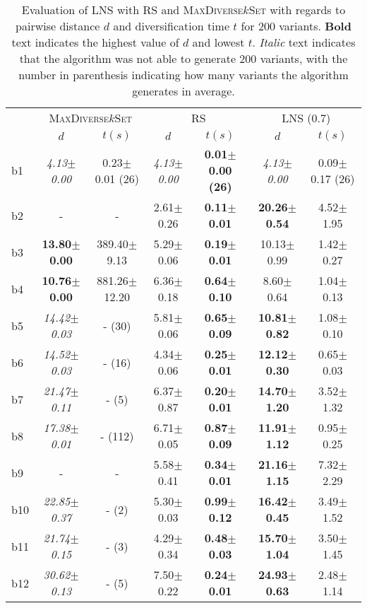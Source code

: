 \begin{longtable}{|l|c|c|c|c|c|c|}
\caption{\label{tab:dist_max_rs_lns} Evaluation of \ac{LNS} with \ac{RS} and \textsc{MaxDiverse$k$Set}
		with regards to pairwise distance $d$ and diversification time $t$ for 200 variants. \textbf{Bold} text indicates the highest value of $d$
		and lowest $t$. \textit{Italic} text indicates that the algorithm was not able to generate
		200 variants, with the number in parenthesis indicating how many variants the algorithm generates in average.}\\
\hline
&\multicolumn{2}{c|}{\textsc{MaxDiverse$k$Set}}&\multicolumn{2}{c|}{{RS}}&\multicolumn{2}{c|}{LNS (0.7)}\\
\cline{2-7}
&$d$&$t(s)$&$d$&$t(s)$&$d$&$t(s)$\\
\hline
b1&\textit{4.13$\pm$0.00} & 0.23$\pm$0.01 (26)&\textit{4.13$\pm$0.00} & \textbf{0.01$\pm$0.00 (26)}&\textit{4.13$\pm$0.00} & 0.09$\pm$0.17 (26)
\\
b2&- & -&2.61$\pm$0.26 & \textbf{0.11$\pm$0.01}&\textbf{20.26$\pm$0.54} & 4.52$\pm$1.95
\\
b3&\textbf{13.80$\pm$0.00} & 389.40$\pm$9.13&5.29$\pm$0.06 & \textbf{0.19$\pm$0.01}&10.13$\pm$0.99 & 1.42$\pm$0.27
\\
b4&\textbf{10.76$\pm$0.00} & 881.26$\pm$12.20&6.36$\pm$0.18 & \textbf{0.64$\pm$0.10}&8.60$\pm$0.64 & 1.04$\pm$0.13
\\
b5&\textit{14.42$\pm$0.03} & - (30)&5.81$\pm$0.06 & \textbf{0.65$\pm$0.09}&\textbf{10.81$\pm$0.82} & 1.08$\pm$0.10
\\
b6&\textit{14.52$\pm$0.03} & - (16)&4.34$\pm$0.06 & \textbf{0.25$\pm$0.01}&\textbf{12.12$\pm$0.30} & 0.65$\pm$0.03
\\
b7&\textit{21.47$\pm$0.11} & - (5)&6.37$\pm$0.87 & \textbf{0.20$\pm$0.01}&\textbf{14.70$\pm$1.20} & 3.52$\pm$1.32
\\
b8&\textit{17.38$\pm$0.01} & - (112)&6.71$\pm$0.05 & \textbf{0.87$\pm$0.09}&\textbf{11.91$\pm$1.12} & 0.95$\pm$0.25
\\
b9&- & -&5.58$\pm$0.41 & \textbf{0.34$\pm$0.01}&\textbf{21.16$\pm$1.15} & 7.32$\pm$2.29
\\
b10&\textit{22.85$\pm$0.37} & - (2)&5.30$\pm$0.03 & \textbf{0.99$\pm$0.12}&\textbf{16.42$\pm$0.45} & 3.49$\pm$1.52
\\
b11&\textit{21.74$\pm$0.15} & - (3)&4.29$\pm$0.34 & \textbf{0.48$\pm$0.03}&\textbf{15.70$\pm$1.04} & 3.50$\pm$1.45
\\
b12&\textit{30.62$\pm$0.13} & - (5)&7.50$\pm$0.22 & \textbf{0.24$\pm$0.01}&\textbf{24.93$\pm$0.63} & 2.48$\pm$1.14

\end{longtable}
